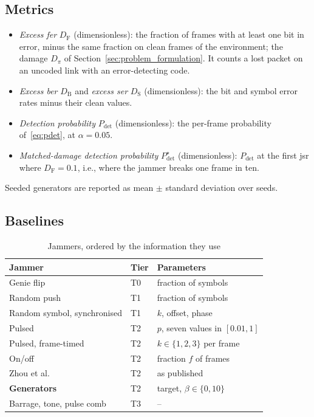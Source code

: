 \subsection{Metrics} \label{sec:expsetup:metrics}
\begin{itemize}
    \item \textit{Excess \ac{fer}} $D_\text{F}$ (dimensionless): the fraction of frames with at least one bit in error, minus the same fraction on clean frames of the environment; the damage $D_\pi$ of Section~\ref{sec:problem_formulation}.
    It counts a lost packet on an uncoded link with an error-detecting code.
    \item \textit{Excess \ac{ber}} $D_\text{B}$ and \textit{excess \ac{ser}} $D_\text{S}$ (dimensionless): the bit and symbol error rates minus their clean values.
    \item \textit{Detection probability} $P_\text{det}$ (dimensionless): the per-frame probability of~\eqref{eq:pdet}, at $\alpha=0.05$.
    \item \textit{Matched-damage detection probability} $P^{\star}_\text{det}$ (dimensionless): $P_\text{det}$ at the first \ac{jsr} where $D_\text{F}=0.1$, i.e., where the jammer breaks one frame in ten.
\end{itemize}
Seeded generators are reported as mean $\pm$ standard deviation over seeds.

\subsection{Baselines} \label{sec:expsetup:baselines}

\begin{table}[t]
\centering
\caption{Jammers, ordered by the information they use}
\label{tab:attackers}
\begin{tabular}{@{}lll@{}}
\toprule
Jammer & Tier & Parameters \\
\midrule
Genie flip & T0 & fraction of symbols \\
Random push & T1 & fraction of symbols \\
Random symbol, synchronised & T1 & $k$, offset, phase \\
Pulsed~\cite{amuru2015optimal} & T2 & $p$, seven values in $[0.01,1]$ \\
Pulsed, frame-timed & T2 & $k\in\{1,2,3\}$ per frame \\
On/off & T2 & fraction $f$ of frames \\
Zhou et al.~\cite{11184988} & T2 & as published \\
\textbf{Generators} & T2 & target, $\beta\in\{0,10\}$ \\
Barrage, tone, pulse comb~\cite{li2022jamming_ofdm} & T3 & -- \\
\bottomrule
\end{tabular}
\end{table}

